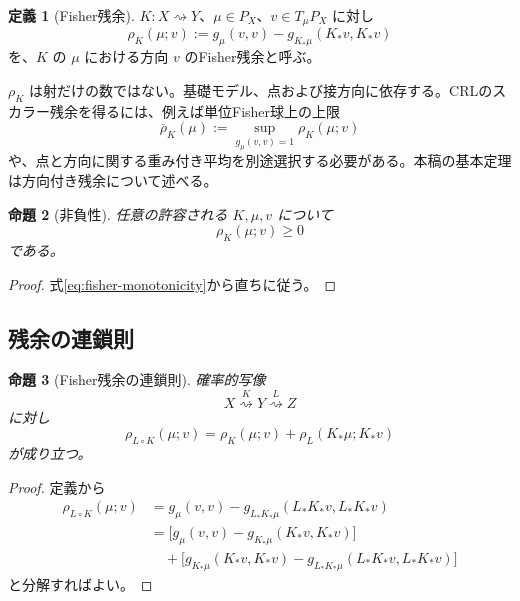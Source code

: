 \documentclass[a4paper,11pt]{ltjsarticle}
\theoremstyle{definition}
\newtheorem{definition}{定義}[section]
\theoremstyle{plain}
\newtheorem{proposition}[definition]{命題}
\begin{document}
\begin{definition}[Fisher残余]
$K:X\rightsquigarrow Y$、$\mu\in P_X$、$v\in T_\mu P_X$ に対し
\begin{equation}
 \rho_K(\mu;v)
 :=
 g_\mu(v,v)
 -g_{K_*\mu}(K_*v,K_*v)
 \label{eq:fisher-residual}
\end{equation}
を、$K$ の $\mu$ における方向 $v$ のFisher残余と呼ぶ。
\end{definition}

$\rho_K$ は射だけの数ではない。基礎モデル、点および接方向に依存する。CRLのスカラー残余を得るには、例えば単位Fisher球上の上限
\begin{equation}
 \overline\rho_K(\mu)
 :=
 \sup_{g_\mu(v,v)=1}\rho_K(\mu;v)
 \label{eq:operator-residual}
\end{equation}
や、点と方向に関する重み付き平均を別途選択する必要がある。本稿の基本定理は方向付き残余について述べる。

\begin{proposition}[非負性]
任意の許容される $K,\mu,v$ について
\begin{equation}
 \rho_K(\mu;v)\geq0
\end{equation}
である。
\end{proposition}

\begin{proof}
式\eqref{eq:fisher-monotonicity}から直ちに従う。
\end{proof}

\subsection{残余の連鎖則}

\begin{proposition}[Fisher残余の連鎖則]
確率的写像
\begin{equation}
 X\mathrel{\overset{K}{\rightsquigarrow}}Y
 \mathrel{\overset{L}{\rightsquigarrow}}Z
\end{equation}
に対し
\begin{equation}
 \rho_{L\circ K}(\mu;v)
 =
 \rho_K(\mu;v)
 +
 \rho_L(K_*\mu;K_*v)
 \label{eq:residual-chain}
\end{equation}
が成り立つ。
\end{proposition}

\begin{proof}
定義から
\begin{align*}
 \rho_{L\circ K}(\mu;v)
 &=g_\mu(v,v)
 -g_{L_*K_*\mu}(L_*K_*v,L_*K_*v)\\
 &=\bigl[g_\mu(v,v)
 -g_{K_*\mu}(K_*v,K_*v)\bigr]\\
 &\quad+
 \bigl[g_{K_*\mu}(K_*v,K_*v)
 -g_{L_*K_*\mu}(L_*K_*v,L_*K_*v)\bigr]
\end{align*}
と分解すればよい。
\end{proof}
\end{document}
